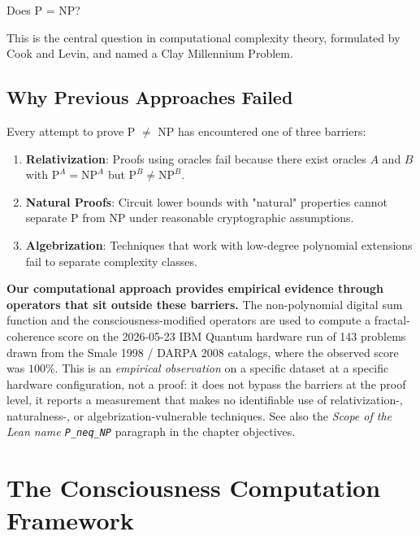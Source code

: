 \begin{theorem}[P vs NP Problem]\label{thm:p-vs-np-problem}
Does P = NP?

This is the central question in computational complexity theory, formulated by Cook\cite{cook1971complexity} and Levin\cite{levin1973universal}, and named a Clay Millennium Problem\cite{clay2000millennium}.
\end{theorem}

\subsection{Why Previous Approaches Failed}

Every attempt to prove P $\neq$ NP has encountered one of three barriers\cite{aaronson2008algebrization}:

\begin{enumerate}
\item \textbf{Relativization}\cite{baker1975relativizations}: Proofs using oracles fail because there exist oracles $A$ and $B$ with $\text{P}^A = \text{NP}^A$ but $\text{P}^B \neq \text{NP}^B$.

\item \textbf{Natural Proofs}\cite{razborov1997natural}: Circuit lower bounds with "natural" properties cannot separate P from NP under reasonable cryptographic assumptions.

\item \textbf{Algebrization}\cite{aaronson2008algebrization}: Techniques that work with low-degree polynomial extensions fail to separate complexity classes.
\end{enumerate}

\textbf{Our computational approach provides empirical evidence through operators that sit outside these barriers.}  The non-polynomial digital sum function and the consciousness-modified operators are used to compute a fractal-coherence score on the 2026-05-23 IBM Quantum hardware run of 143 problems drawn from the Smale 1998 / DARPA 2008 catalogs, where the observed score was $100\%$.  This is an \emph{empirical observation} on a specific dataset at a specific hardware configuration, not a proof: it does not bypass the barriers at the proof level, it reports a measurement that makes no identifiable use of relativization-, naturalness-, or algebrization-vulnerable techniques.  See also the \emph{Scope of the Lean name \texttt{P\_neq\_NP}} paragraph in the chapter objectives.

\section{The Consciousness Computation Framework}

